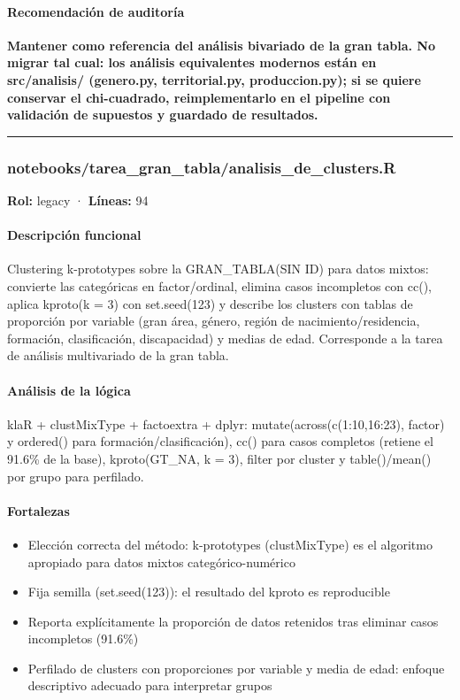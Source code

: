 \paragraph{Recomendación de auditoría}
\textbf{Mantener como referencia del análisis bivariado de la gran tabla. No migrar tal cual: los análisis equivalentes modernos están en src/analisis/ (genero.py, territorial.py, produccion.py); si se quiere conservar el chi-cuadrado, reimplementarlo en el pipeline con validación de supuestos y guardado de resultados.}

\medskip
\hrule

\subsubsection{notebooks/tarea\_gran\_tabla/analisis\_de\_clusters.R}
\textbf{Rol:} legacy · \textbf{Líneas:} 94

\paragraph{Descripción funcional}
Clustering k-prototypes sobre la GRAN\_TABLA(SIN ID) para datos mixtos: convierte las categóricas en factor/ordinal, elimina casos incompletos con cc(), aplica kproto(k = 3) con set.seed(123) y describe los clusters con tablas de proporción por variable (gran área, género, región de nacimiento/residencia, formación, clasificación, discapacidad) y medias de edad. Corresponde a la tarea de análisis multivariado de la gran tabla.

\paragraph{Análisis de la lógica}
klaR + clustMixType + factoextra + dplyr: mutate(across(c(1:10,16:23), factor) y ordered() para formación/clasificación), cc() para casos completos (retiene el 91.6\% de la base), kproto(GT\_NA, k = 3), filter por cluster y table()/mean() por grupo para perfilado.

\paragraph{Fortalezas}
\begin{itemize}
  \item Elección correcta del método: k-prototypes (clustMixType) es el algoritmo apropiado para datos mixtos categórico-numérico
  \item Fija semilla (set.seed(123)): el resultado del kproto es reproducible
  \item Reporta explícitamente la proporción de datos retenidos tras eliminar casos incompletos (91.6\%)
  \item Perfilado de clusters con proporciones por variable y media de edad: enfoque descriptivo adecuado para interpretar grupos
\end{itemize}

